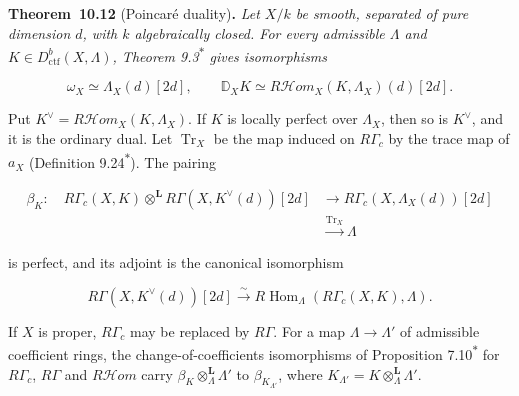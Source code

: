 \documentclass[11pt]{article}
\newenvironment{bpstatement}[2]{\par\addvspace{0.6\baselineskip}\noindent\textbf{#1}#2\textbf{.}\enspace\ignorespaces}
  {\par\addvspace{0.4\baselineskip}}
\newenvironment{bpstatementit}[2]{\begin{bpstatement}{#1}{#2}\itshape\ignorespaces}{\end{bpstatement}}
\newcommand{\bpout}[1]{#1\textsuperscript{\hyperlink{bp-outside}{\ensuremath{\ast}}}}
\providecommand{\cHom}{}\renewcommand{\cHom}{R\mathcal{H}\!om}
\begin{document}
\label{bp37}%
\begin{bpstatementit}{Theorem~10.12}{ (Poincaré duality)}
Let \(X/k\) be smooth, separated of pure dimension \(d\), with \(k\) algebraically closed. For every admissible \(\Lambda\) and \(K\in D^b_{\mathrm{ctf}}(X,\Lambda)\), Theorem \bpout{9.3} gives isomorphisms

\[
\omega_X\simeq\Lambda_X(d)[2d],\qquad
\mathbb D_XK\simeq
\cHom_X(K,\Lambda_X)(d)[2d].
\]

Put \(K^\vee=\cHom_X(K,\Lambda_X)\). If \(K\) is locally perfect over \(\Lambda_X\), then so is \(K^\vee\), and it is the ordinary dual. Let \(\operatorname{Tr}_X\) be the map induced on \(R\Gamma_c\) by the trace map of \(a_X\) (Definition \bpout{9.24}). The pairing

\[
\begin{split}
\beta_K:\quad
R\Gamma_c(X,K)\otimes^{\mathbf L}
R\Gamma(X,K^\vee(d))[2d]
&\longrightarrow R\Gamma_c(X,\Lambda_X(d))[2d]\\
&\xrightarrow{\operatorname{Tr}_X}\Lambda
\end{split}
\tag{10.7}
\]

is perfect, and its adjoint is the canonical isomorphism

\[
R\Gamma(X,K^\vee(d))[2d]
\xrightarrow{\sim}
R\!\operatorname{Hom}_\Lambda(R\Gamma_c(X,K),\Lambda).
\tag{10.8}
\]

If \(X\) is proper, \(R\Gamma_c\) may be replaced by \(R\Gamma\). For a map \(\Lambda\to\Lambda'\) of admissible coefficient rings, the change-of-coefficients isomorphisms of Proposition \bpout{7.10} for \(R\Gamma_c\), \(R\Gamma\) and \(\cHom\) carry \(\beta_K\otimes^{\mathbf L}_\Lambda\Lambda'\) to \(\beta_{K_{\Lambda'}}\), where \(K_{\Lambda'}=K\otimes^{\mathbf L}_\Lambda\Lambda'\).
\end{bpstatementit}
\end{document}
